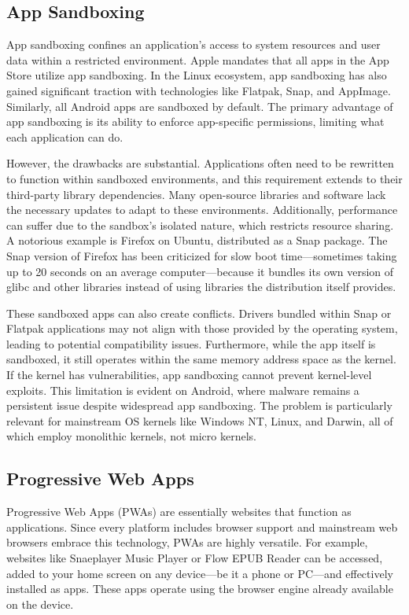 \subsection{App Sandboxing}
App sandboxing confines an application's access to system resources and user data within a restricted environment. Apple mandates that all apps in the App Store utilize app sandboxing\cite{appleAppSandbox}. In the Linux ecosystem, app sandboxing has also gained significant traction with technologies like Flatpak, Snap, and AppImage. Similarly, all Android apps are sandboxed by default. The primary advantage of app sandboxing is its ability to enforce app-specific permissions, limiting what each application can do.

However, the drawbacks are substantial. Applications often need to be rewritten to function within sandboxed environments, and this requirement extends to their third-party library dependencies. Many open-source libraries and software lack the necessary updates to adapt to these environments. Additionally, performance can suffer due to the sandbox's isolated nature, which restricts resource sharing. A notorious example is Firefox on Ubuntu, distributed as a Snap package. The Snap version of Firefox has been criticized for slow boot time—sometimes taking up to 20 seconds on an average computer—because it bundles its own version of glibc and other libraries instead of using libraries the distribution itself provides\cite{ubuntuDecline, whatsWrongWithSnaps}.

These sandboxed apps can also create conflicts. Drivers bundled within Snap or Flatpak applications may not align with those provided by the operating system, leading to potential compatibility issues. Furthermore, while the app itself is sandboxed, it still operates within the same memory address space as the kernel. If the kernel has vulnerabilities, app sandboxing cannot prevent kernel-level exploits. This limitation is evident on Android, where malware remains a persistent issue despite widespread app sandboxing. The problem is particularly relevant for mainstream OS kernels like Windows NT, Linux, and Darwin, all of which employ monolithic kernels, not micro kernels.

\subsection{Progressive Web Apps}
Progressive Web Apps (PWAs) are essentially websites that function as applications. Since every platform includes browser support and mainstream web browsers embrace this technology, PWAs are highly versatile. For example, websites like Snaeplayer Music Player or Flow EPUB Reader can be accessed, added to your home screen on any device—be it a phone or PC—and effectively installed as apps. These apps operate using the browser engine already available on the device.

